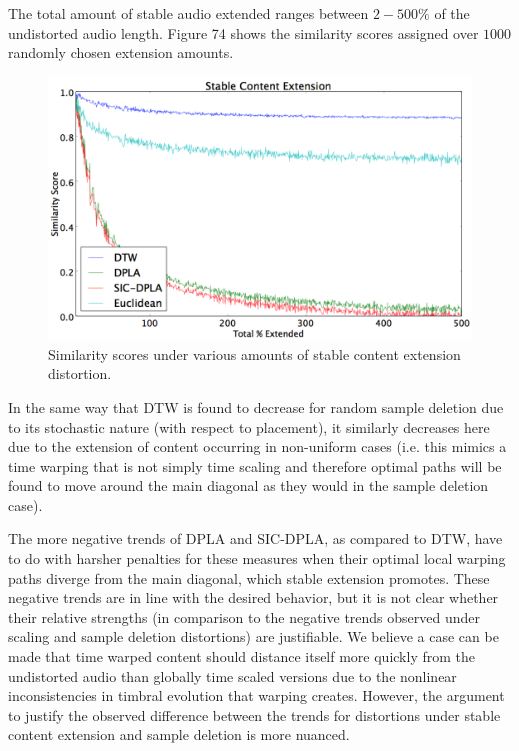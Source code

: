 \documentclass[12pt]{report} 	%
\numberwithin{figure}{chapter}
\numberwithin{table}{chapter}
\numberwithin{equation}{chapter}
\begin{document}
\begin{flushleft}
The total amount of stable audio extended ranges between $2-500\%$ of the undistorted audio length. Figure 74 shows the similarity scores assigned over $1000$ randomly chosen extension amounts.
\vspace{12pt}
\begin{figure}[h!]
\vspace{24pt}\begin{center}
\includegraphics[scale=0.5,width=\linewidth]{StableExtension}
\caption[Extension of stable timbral content results]{Similarity scores under various amounts of stable content extension distortion.}
\end{center}
\vspace{6pt}
\end{figure}
In the same way that DTW is found to decrease for random sample deletion due to its stochastic nature (with respect to placement), it similarly decreases here due to the extension of content occurring in non-uniform cases (i.e. this mimics a time warping that is not simply time scaling and therefore optimal paths will be found to move around the main diagonal as they would in the sample deletion case). 

The more negative trends of DPLA and SIC-DPLA, as compared to DTW, have to do with harsher penalties for these measures when their optimal local warping paths diverge from the main diagonal, which stable extension promotes. These negative trends are in line with the desired behavior, but it is not clear whether their relative strengths (in comparison to the negative trends observed under scaling and sample deletion distortions) are justifiable. We believe a case can be made that time warped content should distance itself more quickly from the undistorted audio than globally time scaled versions due to the nonlinear inconsistencies in timbral evolution that warping creates. However, the argument to justify the observed difference between the trends for distortions under stable content extension and sample deletion is more nuanced.


\end{flushleft}
\end{document}
